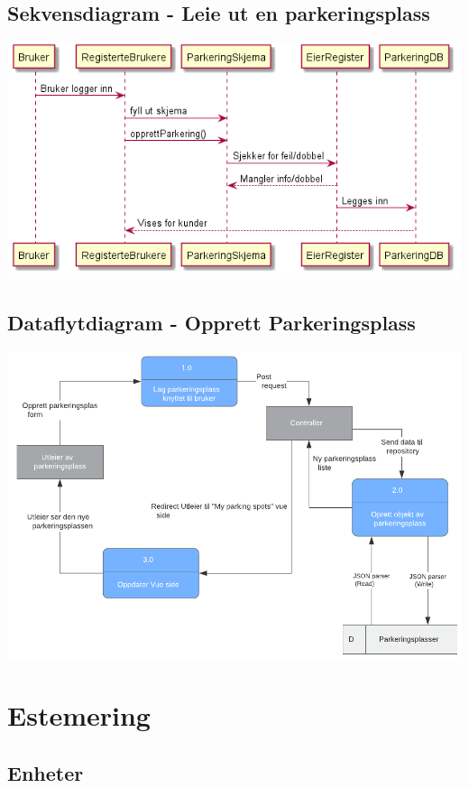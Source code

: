\documentclass[12pt]{article}
\begin{document}
    \subsection{Sekvensdiagram - Leie ut en parkeringsplass}
    \includegraphics[max width=\textwidth]{bilder/diagrammer/sekvensdiagramLeggeUtParkering.png}

    \subsection{Dataflytdiagram - Opprett Parkeringsplass}
    \includegraphics[max width=\textwidth]{bilder/diagrammer/DataflytOpprettParkering.png}

\section{Estemering}

    \subsection{Enheter}
\end{document}
